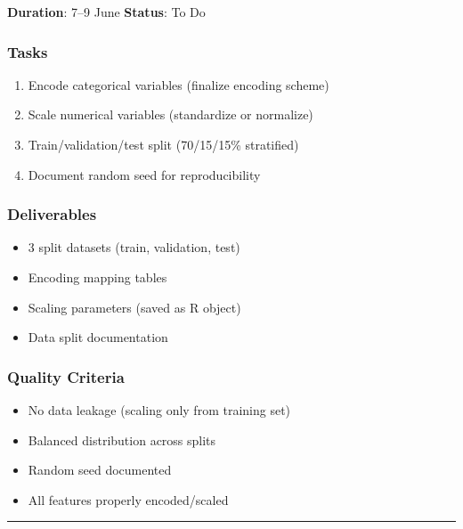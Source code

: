 \documentclass[
  english,
  letterpaper,
  DIV=11,
  numbers=noendperiod]{scrreprt}
\providecommand{\tightlist}{%
  \setlength{\itemsep}{0pt}\setlength{\parskip}{0pt}}
\begin{document}
\textbf{Duration}: 7--9 June \textbar{} \textbf{Status}: To Do

\subsubsection{Tasks}\label{tasks-3}

\begin{enumerate}
\def\labelenumi{\arabic{enumi}.}
\tightlist
\item
  Encode categorical variables (finalize encoding scheme)
\item
  Scale numerical variables (standardize or normalize)
\item
  Train/validation/test split (70/15/15\% stratified)
\item
  Document random seed for reproducibility
\end{enumerate}

\subsubsection{Deliverables}\label{deliverables-4}

\begin{itemize}
\tightlist
\item
  3 split datasets (train, validation, test)
\item
  Encoding mapping tables
\item
  Scaling parameters (saved as R object)
\item
  Data split documentation
\end{itemize}

\subsubsection{Quality Criteria}\label{quality-criteria-3}

\begin{itemize}
\tightlist
\item[$\square$]
  No data leakage (scaling only from training set)
\item[$\square$]
  Balanced distribution across splits
\item[$\square$]
  Random seed documented
\item[$\square$]
  All features properly encoded/scaled
\end{itemize}

\begin{center}\rule{0.5\linewidth}{0.5pt}\end{center}
\end{document}
